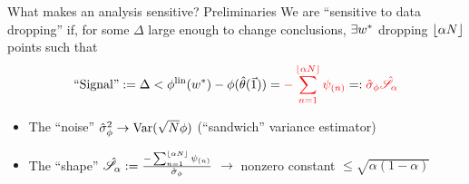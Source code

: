 





\begin{frame}{What makes an analysis sensitive?  Preliminaries}
%
We are ``sensitive to data dropping'' if, for some $\Delta$ large enough to
change conclusions, $\exists w^*$ dropping $\lfloor \alpha N \rfloor$ points such that
%
\begin{align*}
%
\textrm{``Signal''} :=
\Delta < \thetafunlin(\w^*) - \thetafun(\thetahat(\onevec))  =
    {\color{red}- \sum_{n=1}^{\lfloor \alpha N \rfloor} \infl_{(n)} }
    =:  {\color{red} \noise } { \color{red} \shape}
%
\end{align*}
%

\begin{itemize}
\item The ``noise'' $\hat\sigma_{\phi}^2 \rightarrow \mathrm{Var}(\sqrt{N}\phi)$
    (``sandwich'' variance estimator)
\item The ``shape''
    $\hat{\mathscr{S}}_\alpha := \frac{-\sum_{n=1}^{\lfloor \alpha N \rfloor} \psi_{(n)}}{\hat\sigma_{\phi}}$
    $\rightarrow$ nonzero constant
    $\le \sqrt{\alpha (1 - \alpha)}$
\end{itemize}

\begin{center}
\begin{minipage}{0.8\textwidth}
\end{minipage}
\end{center}

\end{frame}



